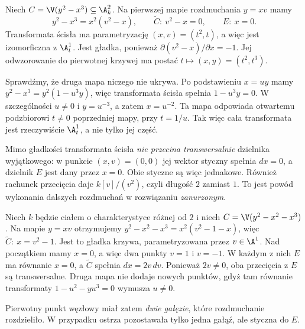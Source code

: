 \begin{przyklad}
\label{prz:ga5-cusp}
Niech $C=\V(y^2-x^3)\subseteq\A^2_k$. Na pierwszej
mapie rozdmuchania $y=xv$ mamy
\[
 y^2-x^3=x^2(v^2-x),\qquad
 \widetilde C:\ v^2-x=0,\qquad E:\ x=0.
\]
Transformata ścisła ma parametryzację
$(x,v)=(t^2,t)$, a więc jest izomorficzna z $\A^1_t$.
Jest gładka, ponieważ $\partial(v^2-x)/\partial x=-1$.
Jej odwzorowanie do pierwotnej krzywej ma postać
$t\mapsto(x,y)=(t^2,t^3)$.

Sprawdźmy, że druga mapa niczego nie ukrywa.
Po podstawieniu $x=uy$ mamy
$y^2-x^3=y^2(1-u^3y)$, więc transformata ścisła
spełnia $1-u^3y=0$. W szczególności $u\ne0$ i
$y=u^{-3}$, a zatem $x=u^{-2}$. Ta mapa odpowiada
otwartemu podzbiorowi $t\ne0$ poprzedniej mapy,
przy $t=1/u$. Tak więc cała transformata jest
rzeczywiście $\A^1_t$, a nie tylko jej część.

Mimo gładkości transformata ścisła \emph{nie przecina
transwersalnie} dzielnika wyjątkowego: w punkcie
$(x,v)=(0,0)$ jej wektor styczny spełnia $dx=0$,
a dzielnik $E$ jest dany przez $x=0$. Obie styczne
są więc jednakowe. Również rachunek przecięcia
daje $k[v]/(v^2)$, czyli długość $2$ zamiast $1$.
To jest powód wykonania dalszych rozdmuchań
w rozwiązaniu \emph{zanurzonym}.
\end{przyklad}

\begin{przyklad}
\label{prz:ga5-node}
Niech $k$ będzie ciałem o charakterystyce różnej od $2$
i niech $C=\V(y^2-x^2-x^3)$. Na mapie $y=xv$
otrzymujemy
$y^2-x^2-x^3=x^2(v^2-1-x)$, więc
$\widetilde C:\ x=v^2-1$. Jest to gładka krzywa,
parametryzowana przez $v\in\A^1$.
Nad początkiem mamy $x=0$, a więc dwa punkty
$v=1$ i $v=-1$. W każdym z nich $E$ ma równanie
$x=0$, a $\widetilde C$ spełnia $dx=2v\,dv$.
Ponieważ $2v\ne0$, oba przecięcia z $E$ są
transwersalne. Druga mapa nie dodaje nowych punktów,
gdyż tam równanie transformaty
$1-u^2-yu^3=0$ wymusza $u\ne0$.

Pierwotny punkt węzłowy miał zatem \emph{dwie gałęzie},
które rozdmuchanie rozdzieliło. W przypadku ostrza
pozostawała tylko jedna gałąź, ale styczna do $E$.
\end{przyklad}

